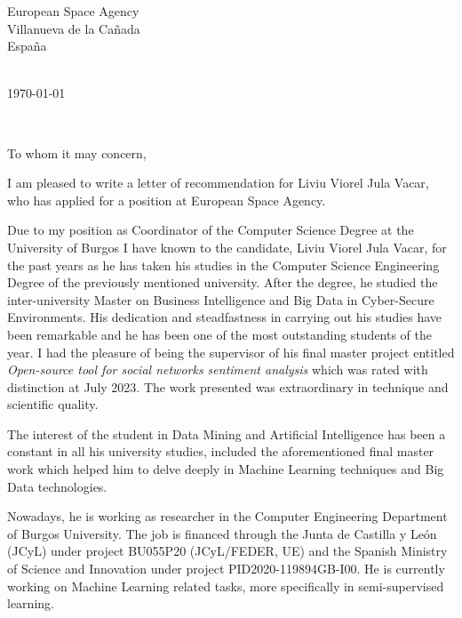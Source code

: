 \documentclass[11pt,a4paper]{letter} %
\def\opening#1{\thispagestyle{empty}
{\centering\fromaddress \vspace{0.6in} \\ %
\hspace*{\longindentation}\today\hspace*{\fill}\par} %
{\raggedright \toname \\ \toaddress \par} %
\vspace{0.4in} %
\noindent #1 %
}
\begin{document}

\begin{letter}
{European Space Agency\\
 Villanueva de la Cañada\\
 España
}


\opening{To whom it may concern,}

I am pleased to write a letter of recommendation for Liviu Viorel Jula Vacar, who has applied for a position at European Space Agency.

Due to my position as Coordinator of the Computer Science Degree at the University of Burgos I have known to the candidate, Liviu Viorel Jula Vacar, for the past years as he has taken his studies in the Computer Science Engineering Degree of the previously mentioned university. After the degree, he studied the inter-university Master on Business Intelligence and Big Data in Cyber-Secure Environments. 
His dedication and steadfastness in carrying out his studies have been remarkable and he has been one of the most outstanding students of the year.
I had the pleasure of being the supervisor of his final master project entitled \textit{Open-source tool for social networks sentiment analysis} which was rated with distinction at July 2023. The work presented was extraordinary in technique and scientific quality.

The interest of the student in Data Mining and Artificial Intelligence has been a constant in all his university studies, included the aforementioned final master work which helped him to delve deeply in Machine Learning techniques and Big Data technologies.

Nowadays, he is working as researcher in the Computer Engineering Department of Burgos University. The job is financed through the Junta de Castilla y Le\'on (JCyL) under project BU055P20 (JCyL/FEDER, UE) and the Spanish Ministry of Science and Innovation under project PID2020-119894GB-I00.
He is currently working on Machine Learning related tasks, more specifically in semi-supervised learning.


\end{letter}
\end{document}
